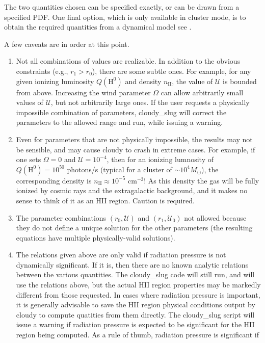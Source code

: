 \documentclass[letterpaper,10pt,english]{sphinxmanual}
\begin{document}
The two quantities chosen can be specified exactly, or can be drawn
from a specified PDF. One final option, which is only available in
cluster mode, is to obtain the required quantities from a dynamical
model \textendash{} see {\hyperref[\detokenize{cloudy:sssec-cloudy-dynamical-cluster-mode}]{}}.

A few caveats are in order at this point.
\begin{enumerate}
\item {} 
Not all combinations of values are realizable. In addition to the
obvious constraints (e.g., \(r_1 > r_0\)), there are some
subtle ones. For example, for any given ionizing luminosity
\(Q(\mathrm{H}^0)\) and density \(n_{\mathrm{II}}\), the
value of \(\mathcal{U}\) is bounded from above. Increasing the
wind parameter \(\Omega\) can allow arbitrarily small values of
\(\mathcal{U}\), but not arbitrarily large ones. If the user
requests a physically impossible combination of parameters,
cloudy\_slug will correct the parameters to the allowed range and
run, while issuing a warning.

\item {} 
Even for parameters that are not physically impossible, the results
may not be sensible, and may cause cloudy to crash in extreme
cases. For example, if one sets \(\Omega = 0\) and
\(\mathcal{U} = 10^{-4}\), then for an ionizing lumnosity of
\(Q(\mathrm{H}^0) = 10^{50}\) photons/s (typical for a cluster
of \(\sim 10^4M_\odot\)), the corresponding density is
\(n_{\mathrm{II}} \approx 10^{-5}\mbox{ cm}^{-3}\)! As this
density the gas will be fully ionized by cosmic rays and the
extragalactic background, and it makes no sense to think of it as
an HII region. Caution is required.

\item {} 
The parameter combinations \((r_0,\mathcal{U})\) and
\((r_1,\mathcal{U}_0)\) not allowed
because they do not define a unique solution for the other
parameters (the resulting equations have multiple physically-valid
solutions).

\item {} 
The relations given above are only valid if radiation pressure is
not dynamically significant. If it is, then there are no known
analytic relations between the various quantities. The cloudy\_slug
code will still run, and will use the relations above, but the
actual HII region properties may be markedly different from those
requested. In cases where radiation pressure is important, it is
generally advisable to save the HII region physical conditions
output by cloudy to compute quatities from them directly. The
cloudy\_slug script will issue a warning if radiation pressure is
expected to be significant for the HII region being computed. As a rule
of thumb, radiation pressure is significant if

\end{enumerate}
\end{document}
